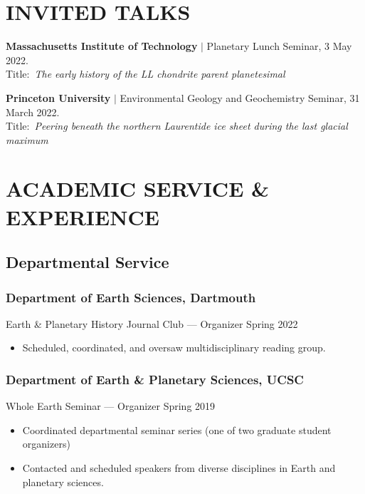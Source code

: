 \documentclass[10pt]{article}
\begin{document}

\section*{INVITED TALKS}

\begin{etaremune} [itemsep=4pt, leftmargin=3ex]

   \item \textbf{Massachusetts Institute of Technology} $|$
   Planetary Lunch Seminar, 3 May 2022. \\
  Title:~\textit{The early history of the LL chondrite parent planetesimal}

  \item \textbf{Princeton University} $|$ 
  Environmental Geology and Geochemistry Seminar, 31 March 2022. \\
  Title:~\textit{Peering beneath the northern Laurentide ice sheet during the last glacial maximum}
  
\end{etaremune}
\vspace{-12pt}

\section*{ACADEMIC SERVICE \& EXPERIENCE}

\subsection*{\textbf{Departmental Service}}
\subsubsection*{Department of Earth Sciences, Dartmouth}
Earth \& Planetary History Journal Club --- Organizer 	 \hfill	Spring 2022
\begin{itemize}
	\item Scheduled, coordinated, and oversaw multidisciplinary reading group.
\end{itemize}

\subsubsection*{Department of Earth \& Planetary Sciences, UCSC}
Whole Earth Seminar --- Organizer \hfill  Spring 2019
\begin{itemize}
	\item Coordinated departmental seminar series (one of two graduate student organizers)
	\item Contacted and scheduled speakers from diverse disciplines in Earth and planetary sciences.
\end{itemize}
\end{document}
